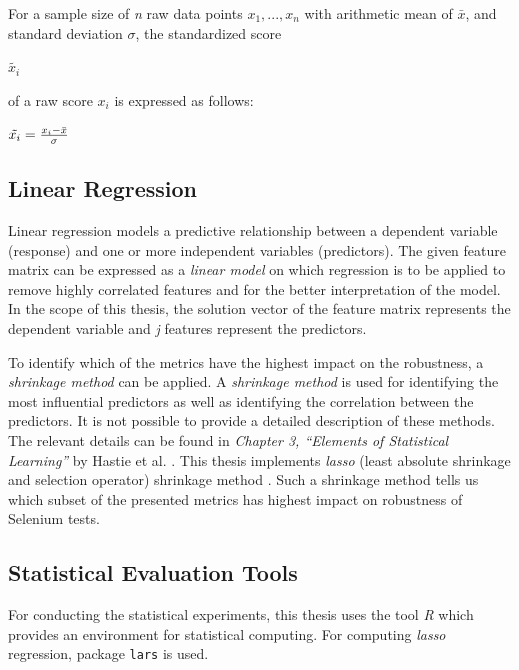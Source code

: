 \theoremstyle{definition}
\begin{definition}{For a sample size of \textit{n} raw data points \textit{$x_1,...,x_n$} with arithmetic mean of $\bar{x}$, and standard deviation $\sigma$, the standardized score \begin{large}
$\tilde{x_{i}}$
\end{large} of a raw score \textit{$x_{i}$} is expressed as follows: }
\begin{center}\Large
$\begin{tiny}
\tilde{x_{i}}
\end{tiny} = {x_{i}- \bar{x} \over \sigma}$
\label{def:standardization}
\end{center}
\end{definition}

\subsection{Linear Regression}

Linear regression models a predictive relationship between a dependent variable (response) and one or more independent variables (predictors). The given feature matrix can be expressed as a \textit{linear model} on which regression is to be applied to remove highly correlated features and for the better interpretation of the model. In the scope of this thesis, the solution vector of the feature matrix represents the dependent variable and \textit{j} features represent the predictors. 

To identify which of the metrics have the highest impact on the robustness, a \textit{shrinkage method} can be applied. A \textit{shrinkage method} is used for identifying the most influential predictors as well as identifying the correlation between the predictors. It is not possible to provide a detailed description of these methods. The relevant details can be found in \textit{Chapter 3, ``Elements of Statistical Learning''} by Hastie et al. \cite{hastie01statisticallearning}. This thesis implements \textit{lasso} (least absolute shrinkage and selection operator) shrinkage method \cite{tibshirani1996regression}. Such a shrinkage method tells us which subset of the presented metrics has highest impact on robustness of Selenium tests.

\subsection{Statistical Evaluation Tools}
For conducting the statistical experiments, this thesis uses the tool \textit{R} \cite{Rtool} which provides an environment for statistical computing. For computing \textit{lasso} regression, package \texttt{lars} \cite{larspack} is used. 
